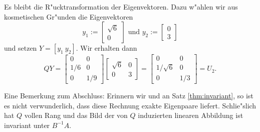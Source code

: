 Es bleibt die R"ucktransformation der Eigenvektoren. Dazu w"ahlen wir aus kosmetischen Gr"unden die Eigenvektoren
\[
y_1 := \begin{bmatrix}
\sqrt6 \\ 0
\end{bmatrix}
\text{ und }
y_2 := \begin{bmatrix}
0 \\ 3
\end{bmatrix}
\]
und setzen $Y = [y_1 \ y_2]$. Wir erhalten dann
\[
QY = \begin{bmatrix} 0 & 0 \\ 1/6 & 0 \\ 0 & 1/9 \end{bmatrix}
\begin{bmatrix}
\sqrt6 & 0 \\ 0 & 3
\end{bmatrix}
=
\begin{bmatrix} 0 & 0  \\ 1/\sqrt6 & 0  \\ 0 & 1/3  \end{bmatrix}
= U_2.
\]

Eine Bemerkung zum Abschluss: Erinnern wir und an Satz \ref{thm:invariant}, so ist es nicht verwunderlich, dass diese Rechnung
exakte Eigenpaare liefert. Schlie"slich hat $Q$
vollen Rang und das Bild der von $Q$ induzierten linearen Abbildung ist invariant unter $B^{-1}A$.




